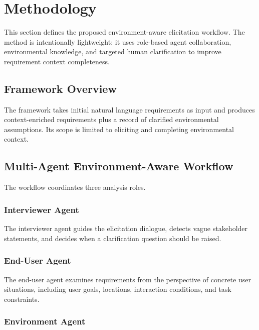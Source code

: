\section{Methodology}
\label{methodology}

This section defines the proposed environment-aware elicitation workflow.
The method is intentionally lightweight: it uses role-based agent collaboration, environmental knowledge, and targeted human clarification to improve requirement context completeness.

\subsection{Framework Overview}
\label{method:overview}

The framework takes initial natural language requirements as input and produces context-enriched requirements plus a record of clarified environmental assumptions.
Its scope is limited to eliciting and completing environmental context.

\subsection{Multi-Agent Environment-Aware Workflow}
\label{method:workflow}

The workflow coordinates three analysis roles.

\subsubsection{Interviewer Agent}
\label{method:interviewer_agent}

The interviewer agent guides the elicitation dialogue, detects vague stakeholder statements, and decides when a clarification question should be raised.

\subsubsection{End-User Agent}
\label{method:end_user_agent}

The end-user agent examines requirements from the perspective of concrete user situations, including user goals, locations, interaction conditions, and task constraints.

\subsubsection{Environment Agent}
\label{method:environment_agent}

